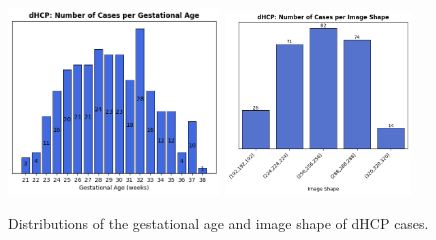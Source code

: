 \begin{figure}[hbtp]
    \centering
    \includegraphics[width=0.5\textwidth]{figures/dHCP_GA.png} \quad
    \includegraphics[width=0.44\textwidth]{figures/dHCP_image_shape.png}
    \caption{Distributions of the gestational age and image shape of dHCP cases.}
    \label{fig:dhcp_plots}
\end{figure}
